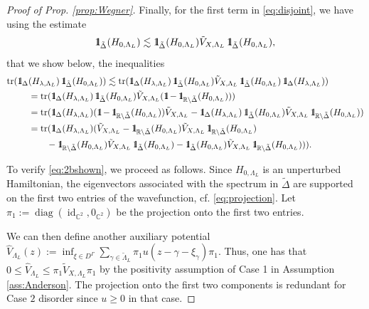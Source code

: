 \documentclass[reqno,12pt,letterpaper]{amsart}
\newcommand{\RR}{{\mathbb R}}
\newcommand{\CC}{{\mathbb C}}
\numberwithin{equation}{section}
\DeclareMathOperator{\tr}{tr}
\def\indic{\operatorname{1\hskip-2.75pt\relax l}}
\begin{document}
\begin{proof}[Proof of Prop. \ref{prop:Wegner}]
Finally, for the first term in \eqref{eq:disjoint}, we have using the estimate
\begin{equation}
\label{eq:2bshown}
\indic_{\tilde \Delta}(H_{0,\Lambda_L}) \lesssim \indic_{\tilde \Delta}(H_{0,\Lambda_L}) \tilde V_{X,\Lambda_L}  \indic_{\tilde \Delta}(H_{0,\Lambda_L}),
\end{equation}
that we show below, the inequalities
\begin{equation}
\label{eq:rechnung}
\begin{split}  \tr(\indic_{\Delta}&(H_{\lambda,\Lambda_L})\indic_{\tilde \Delta}(H_{0,\Lambda_L}))\lesssim \tr(\indic_{\Delta}(H_{\lambda,\Lambda_L})\indic_{\tilde \Delta}(H_{0,\Lambda_L}) \tilde V_{X,\Lambda_L}  \indic_{\tilde \Delta}(H_{0,\Lambda_L})\indic_{\Delta}(H_{\lambda,\Lambda_L}))\\
&= \tr(\indic_{\Delta}(H_{\lambda,\Lambda_L})\indic_{\tilde \Delta}(H_{0,\Lambda_L}) \tilde V_{X,\Lambda_L} (\indic- \indic_{\RR\setminus \tilde \Delta}(H_{0,\Lambda_L})))\\
&= \tr(\indic_{\Delta}(H_{\lambda,\Lambda_L}) (\indic-\indic_{\RR\setminus \tilde \Delta}(H_{0,\Lambda_L}))\tilde V_{X,\Lambda_L} -\indic_{\Delta}(H_{\lambda,\Lambda_L})\indic_{\tilde \Delta}(H_{0,\Lambda_L}) \tilde V_{X,\Lambda_L} \indic_{\RR\setminus \tilde \Delta}(H_{0,\Lambda_L}))\\
&= \tr(\indic_{\Delta}(H_{\lambda,\Lambda_L})(\tilde V_{X,\Lambda_L} -\indic_{\RR\setminus\tilde \Delta}(H_{0,\Lambda_L}) \tilde V_{X,\Lambda_L} \indic_{\RR\setminus\tilde \Delta}(H_{0,\Lambda_L})  \\
&\qquad -\indic_{\RR\setminus\tilde \Delta}(H_{0,\Lambda_L}) \tilde V_{X,\Lambda_L}  \indic_{\tilde \Delta}(H_{0,\Lambda_L})  -\indic_{\tilde \Delta}(H_{0,\Lambda_L})\tilde V_{X,\Lambda_L} \indic_{\RR\setminus\tilde \Delta}(H_{0,\Lambda_L}))).
\end{split}
\end{equation}

To verify \eqref{eq:2bshown}, we proceed as follows.
Since $H_{0,\Lambda_L}$ is an unperturbed Hamiltonian, the eigenvectors associated with the spectrum in $\tilde \Delta$ are supported on the first two entries of the wavefunction, cf. \eqref{eq:projection}. Let $\pi_1:=\operatorname{diag}(\operatorname{id}_{\CC^2},0_{\CC^2})$ be the projection onto the first two entries. 


We can then define another auxiliary potential $\hat V_{\Lambda_L}(z):=\inf_{\xi \in D^{\Gamma}}\sum_{\gamma \in \tilde\Lambda_L} \pi_1 u(z-\gamma-\xi_{\gamma})\pi_1.$ Thus, one has that $0 \le \hat V_{\Lambda_L} \le \pi_1 \tilde V_{X,\Lambda_L}\pi_1$ {by the positivity assumption of Case 1 in Assumption \ref{ass:Anderson}.} The projection onto the first two components is redundant for Case $2$ disorder since $u \ge 0$ in that case. 


\end{proof}
\end{document}
